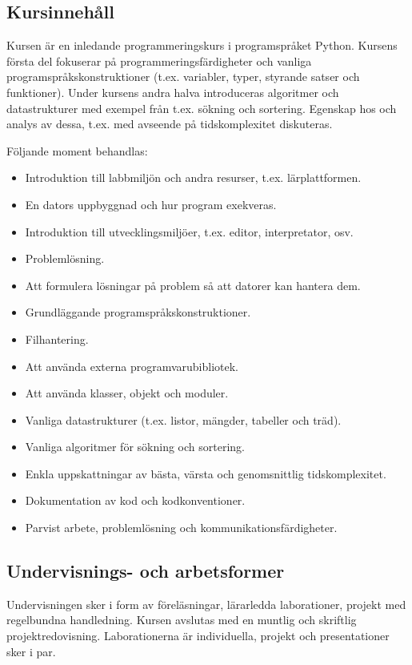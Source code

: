 \subsection*{Kursinnehåll}

Kursen är en inledande programmeringskurs i programspråket Python.
Kursens första del fokuserar på programmeringsfärdigheter och vanliga
programspråkskonstruktioner (t.ex. variabler, typer, styrande satser och
funktioner). Under kursens andra halva introduceras algoritmer och
datastrukturer med exempel från t.ex. sökning och sortering. Egenskap
hos och analys av dessa, t.ex. med avseende på tidskomplexitet
diskuteras.

Följande moment behandlas:

\begin{itemize}
\tightlist
\item
  Introduktion till labbmiljön och andra resurser, t.ex. lärplattformen.
\item
  En dators uppbyggnad och hur program exekveras.
\item
  Introduktion till utvecklingsmiljöer, t.ex. editor, interpretator,
  osv.
\item
  Problemlösning.
\item
  Att formulera lösningar på problem så att datorer kan hantera dem.
\item
  Grundläggande programspråkskonstruktioner.
\item
  Filhantering.
\item
  Att använda externa programvarubibliotek.
\item
  Att använda klasser, objekt och moduler.
\item
  Vanliga datastrukturer (t.ex. listor, mängder, tabeller och träd).
\item
  Vanliga algoritmer för sökning och sortering.
\item
  Enkla uppskattningar av bästa, värsta och genomsnittlig
  tidskomplexitet.
\item
  Dokumentation av kod och kodkonventioner.
\item
  Parvist arbete, problemlösning och kommunikationsfärdigheter.
\end{itemize}

\subsection*{Undervisnings- och arbetsformer}

Undervisningen sker i form av föreläsningar, lärarledda laborationer,
projekt med regelbundna handledning. Kursen avslutas med en muntlig och
skriftlig projektredovisning. Laborationerna är individuella, projekt
och presentationer sker i par.

